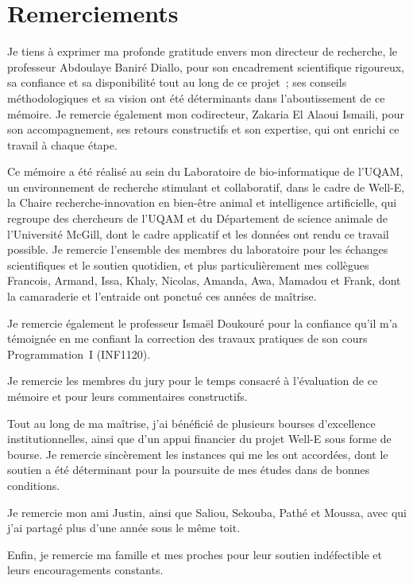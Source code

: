 \chapter*{Remerciements}

Je tiens à exprimer ma profonde gratitude envers mon directeur de recherche, le professeur
Abdoulaye Baniré Diallo, pour son encadrement scientifique rigoureux, sa confiance et sa
disponibilité tout au long de ce projet~; ses conseils méthodologiques et sa vision ont été
déterminants dans l'aboutissement de ce mémoire. Je remercie également mon codirecteur,
Zakaria El Alaoui Ismaili, pour son accompagnement, ses retours constructifs et son
expertise, qui ont enrichi ce travail à chaque étape.

Ce mémoire a été réalisé au sein du Laboratoire de bio-informatique de l'UQAM, un
environnement de recherche stimulant et collaboratif, dans le cadre de Well-E, la Chaire
recherche-innovation en bien-être animal et intelligence artificielle, qui regroupe des
chercheurs de l'UQAM et du Département de science animale de l'Université McGill, dont le
cadre applicatif et les données ont rendu ce travail possible. Je remercie l'ensemble des membres du laboratoire pour les
échanges scientifiques et le soutien quotidien, et plus particulièrement mes collègues
Francois, Armand, Issa, Khaly, Nicolas, Amanda, Awa, Mamadou et Frank, dont la camaraderie et l'entraide ont
ponctué ces années de maîtrise.

Je remercie également le professeur Ismaël Doukouré pour la confiance qu'il m'a témoignée en
me confiant la correction des travaux pratiques de son cours Programmation~I (INF1120).

Je remercie les membres du jury pour le temps consacré à l'évaluation de ce mémoire et pour
leurs commentaires constructifs.

Tout au long de ma maîtrise, j'ai bénéficié de plusieurs bourses d'excellence
institutionnelles, ainsi que d'un appui financier du projet Well-E sous forme de
bourse. Je remercie sincèrement les instances qui me les ont accordées, dont le soutien a été
déterminant pour la poursuite de mes études dans de bonnes conditions.

Je remercie mon ami Justin, ainsi que Saliou, Sekouba, Pathé et Moussa, avec qui j'ai
partagé plus d'une année sous le même toit.

Enfin, je remercie ma famille et mes proches pour leur soutien indéfectible et leurs
encouragements constants.
